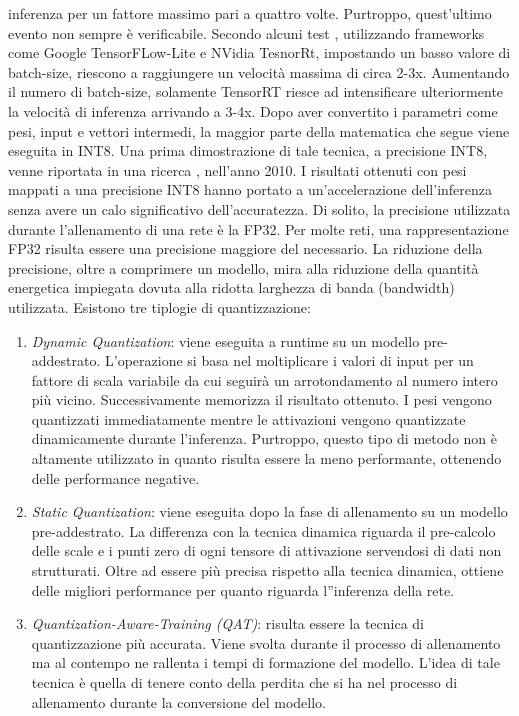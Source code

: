 inferenza per un fattore massimo pari a quattro volte. Purtroppo, quest'ultimo 
evento non sempre è verificabile. Secondo alcuni test \cite{LIANG2021370}, utilizzando 
frameworks come Google TensorFLow-Lite e NVidia TesnorRt, impostando 
un basso valore di batch-size, riescono a raggiungere un velocità massima 
di circa 2-3x. Aumentando il numero di batch-size, solamente TensorRT 
riesce ad intensificare ulteriormente la velocità di inferenza arrivando a 
3-4x. Dopo aver convertito i parametri come pesi, input e vettori intermedi, 
la maggior parte della matematica che segue viene eseguita in INT8. Una 
prima dimostrazione di tale tecnica, a precisione INT8, venne riportata 
in una ricerca \cite{37631}, nell'anno 2010. I risultati ottenuti con pesi mappati 
a una precisione INT8 hanno portato a un'accelerazione dell'inferenza
senza avere un calo significativo dell'accuratezza. Di solito, la precisione 
utilizzata durante l'allenamento di una rete è la FP32. Per molte reti, una 
rappresentazione FP32 risulta essere una precisione maggiore del necessario.
La riduzione della precisione, oltre a comprimere un modello, mira alla riduzione della 
quantità energetica impiegata dovuta alla ridotta larghezza 
di banda (bandwidth) utilizzata. Esistono tre tiplogie di quantizzazione:
\begin{enumerate}
    \item \emph{Dynamic Quantization}: viene eseguita a runtime su un modello pre-addestrato. 
    L'operazione si basa nel moltiplicare i valori di input 
    per un fattore di scala variabile da cui seguirà un arrotondamento al 
    numero intero più vicino. Successivamente memorizza il risultato ottenuto. 
    I pesi vengono quantizzati immediatamente mentre le attivazioni 
    vengono quantizzate dinamicamente durante l'inferenza. Purtroppo, 
    questo tipo di metodo non è altamente utilizzato in quanto risulta 
    essere la meno performante, ottenendo delle performance negative.
    \item \emph{Static Quantization}: viene eseguita dopo la fase di allenamento su un 
    modello pre-addestrato. La differenza con la tecnica dinamica riguarda 
    il pre-calcolo delle scale e i punti zero di ogni tensore di attivazione 
    servendosi di dati non strutturati. Oltre ad essere più precisa rispetto 
    alla tecnica dinamica, ottiene delle migliori performance per quanto 
    riguarda l''inferenza della rete.
    \item \emph{Quantization-Aware-Training (QAT)}: risulta essere la tecnica di quantizzazione 
    più accurata. Viene svolta durante il processo di allenamento 
    ma al contempo ne rallenta i tempi di formazione del modello. 
    L'idea di tale tecnica è quella di tenere conto della perdita che si ha 
    nel processo di allenamento durante la conversione del modello.
\end{enumerate}


